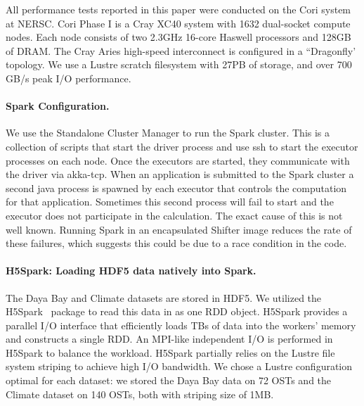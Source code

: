 All performance tests reported in this paper were conducted on the Cori system at NERSC. Cori Phase I is a Cray XC40 system with 1632 dual-socket compute nodes. Each node consists of two 2.3GHz 16-core Haswell processors and 128GB of DRAM. The Cray Aries high-speed interconnect is configured in a ``Dragonfly' topology. We use a Lustre scratch filesystem with 27PB of storage, and over 700 GB/s peak I/O performance. 

\paragraph{Spark Configuration.}
We use the Standalone Cluster Manager to run the Spark cluster. This is a collection of scripts that start the driver process and use ssh to start the executor processes on each node. Once the executors are started, they communicate with the driver via akka-tcp. When an application is submitted to the Spark cluster a second java process is spawned by each executor that controls the computation for that application. Sometimes this second process will fail to start and the executor does not participate in the calculation. The exact cause of this is not well known. Running Spark in an encapsulated Shifter image reduces the rate of these failures, which suggests this could be due to a race condition in the code.

\paragraph{H5Spark: Loading HDF5 data natively into Spark.}
The Daya Bay and Climate datasets are stored in HDF5. We utilized the H5Spark~\cite{h5spark-cug16} package to read this data in as one RDD object. H5Spark provides a parallel I/O interface that efficiently loads TBs of data into the workers' memory and constructs a single RDD. An MPI-like independent I/O is performed in H5Spark to balance the workload. H5Spark partially relies on the Lustre file system striping to achieve high I/O bandwidth. We chose a Lustre configuration optimal for each dataset: we stored the Daya Bay data on 72 OSTs and the Climate dataset on 140 OSTs, both with striping size of 1MB. 

